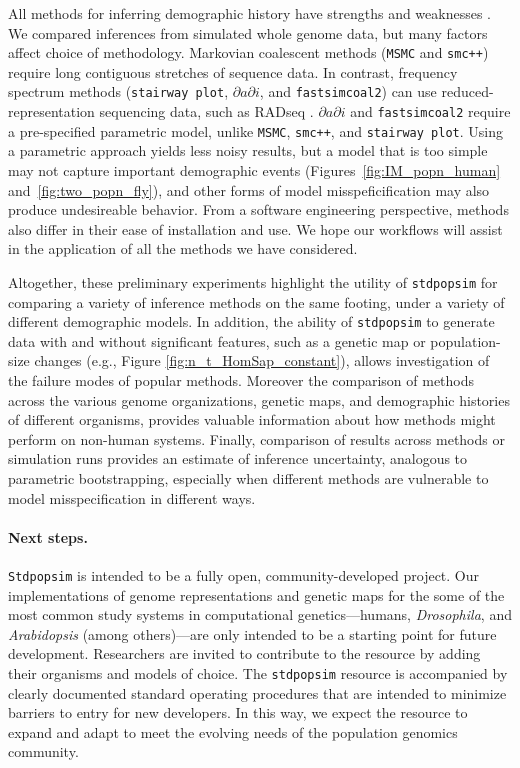 \documentclass[12pt,halfline,a4paper]{ouparticle}
\newcommand{\Stdpopsim}{\texttt{Stdpopsim}\xspace}
\newcommand{\stdpopsim}{\texttt{stdpopsim}\xspace}
\newcommand{\dadi}{$\partial a \partial i$\xspace}
\newcommand{\MSMC}{\texttt{MSMC}\xspace}
\newcommand{\smcpp}{\texttt{smc++}\xspace}
\newcommand{\stairwayplot}{\texttt{stairway plot}\xspace}
\newcommand{\fastsimcoal}{\texttt{fastsimcoal2}\xspace}
\begin{document}
All methods for inferring demographic history have strengths and weaknesses \citep[as recently reviewed by][]{beichman2018review}.
We compared inferences from simulated whole genome data, but many factors affect choice of methodology.
Markovian coalescent methods (\MSMC and \smcpp) require long contiguous stretches of sequence data.
In contrast, frequency spectrum methods (\stairwayplot, \dadi, and \fastsimcoal) can use reduced-representation sequencing data, such as RADseq \citep{andrews2016radseq}.
\dadi and \fastsimcoal require a pre-specified parametric model, unlike \MSMC, \smcpp, and \stairwayplot.
Using a parametric approach yields less noisy results, but a model that is too simple may not capture important demographic events (Figures~\ref{fig:IM_popn_human} and~\ref{fig:two_popn_fly}),
and other forms of model misspeficification may also produce undesireable behavior.
From a software engineering perspective, methods also differ in their ease of installation and use.
We hope our workflows will assist in the application of all the methods we have considered.

Altogether, these preliminary experiments highlight
the utility of \stdpopsim for comparing a variety of inference methods on
the same footing, under a variety of different demographic models.
In addition, the ability of \stdpopsim to generate data with and without significant features, such
as a genetic map or population-size changes (e.g., Figure \ref{fig:n_t_HomSap_constant}), allows
investigation of the failure modes of popular methods.
Moreover the comparison of methods across the various genome organizations, genetic maps,
and demographic histories of different organisms, provides valuable information
about how methods might perform on non-human systems.
Finally, comparison of results across methods or simulation runs
provides an estimate of inference uncertainty, analogous to parametric bootstrapping,
especially when different methods are vulnerable to model misspecification in different ways.

\paragraph{Next steps.}
\Stdpopsim is intended to be a fully open, community-developed project.
Our implementations of genome representations and genetic maps for the some of
the most common study systems in computational genetics---humans, \textit{Drosophila},
and \textit{Arabidopsis} (among others)---are only intended to be a starting point for
future development.
Researchers are invited to contribute to the resource by adding their
organisms and models of choice. The \stdpopsim resource is
accompanied by clearly documented standard operating procedures that are
intended to minimize barriers to entry for new developers.  In this way, we
expect the resource to expand and adapt to meet the evolving needs of the
population genomics community.
\end{document}
